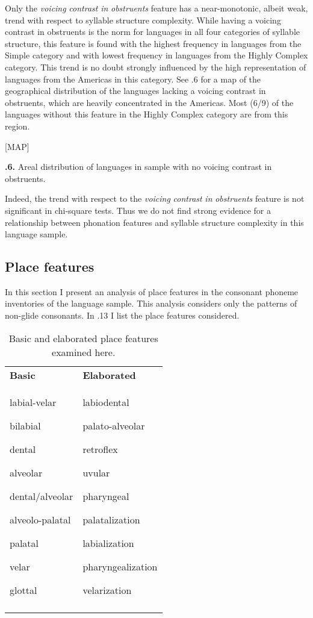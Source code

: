   Only the \textit{voicing} \textit{contrast} \textit{in} \textit{obstruents} feature has a near-monotonic, albeit weak, trend with respect to syllable structure complexity. While having a voicing contrast in obstruents is the norm for languages in all four categories of syllable structure, this feature is found with the highest frequency in languages from the Simple category and with lowest frequency in languages from the Highly Complex category. This trend is no doubt strongly influenced by the high representation of languages from the Americas in this category. See .6 for a map of the geographical distribution of the languages lacking a voicing contrast in obstruents, which are heavily concentrated in the Americas. Most (6/9) of the languages without this feature in the Highly Complex category are from this region.

[MAP]

\textbf{.6.} Areal distribution of languages in sample with no voicing contrast in obstruents.

  Indeed, the trend with respect to the \textit{voicing} \textit{contrast} \textit{in} \textit{obstruents} feature is not significant in chi-square tests. Thus we do not find strong evidence for a relationship between phonation features and syllable structure complexity in this language sample.

\subsection{Place features}\label{sec:4.4.4}

  In this section I present an analysis of place features in the consonant phoneme inventories of the language sample. This analysis considers only the patterns of non-glide consonants. In .13 I list the place features considered.

\begin{table}
\begin{tabularx}{\textwidth}{XX}
\lsptoprule

\textbf{Basic} & \textbf{Elaborated}\\
labial-velar

bilabial

dental

alveolar

dental/alveolar

alveolo-palatal

palatal

velar

glottal & labiodental

palato-alveolar

retroflex

uvular

pharyngeal

palatalization

labialization

pharyngealization

velarization\\
\lspbottomrule
\end{tabularx}
\caption{\label{4.13}Basic and elaborated place features examined here.}
\end{table}

